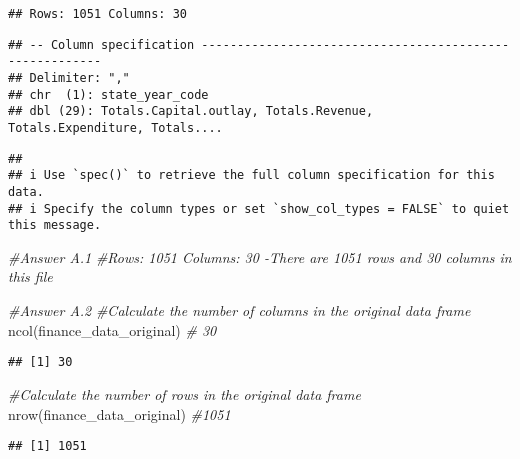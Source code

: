 \documentclass[
]{article}
\newenvironment{Shaded}{\begin{snugshade}}{\end{snugshade}}
\newcommand{\CommentTok}[1]{\textcolor[rgb]{0.56,0.35,0.01}{\textit{#1}}}
\newcommand{\FunctionTok}[1]{\textcolor[rgb]{0.00,0.00,0.00}{#1}}
\newcommand{\NormalTok}[1]{#1}
\begin{document}
\begin{verbatim}
## Rows: 1051 Columns: 30
\end{verbatim}

\begin{verbatim}
## -- Column specification --------------------------------------------------------
## Delimiter: ","
## chr  (1): state_year_code
## dbl (29): Totals.Capital.outlay, Totals.Revenue, Totals.Expenditure, Totals....
\end{verbatim}

\begin{verbatim}
## 
## i Use `spec()` to retrieve the full column specification for this data.
## i Specify the column types or set `show_col_types = FALSE` to quiet this message.
\end{verbatim}

\begin{Shaded}
\begin{Highlighting}[]
\CommentTok{\#Answer A.1}
\CommentTok{\#Rows: 1051 Columns: 30 {-}There are 1051 rows and 30 columns in this file}
\end{Highlighting}
\end{Shaded}

\begin{Shaded}
\begin{Highlighting}[]
\CommentTok{\#Answer A.2}
\CommentTok{\#Calculate the number of columns in the original data frame}
\FunctionTok{ncol}\NormalTok{(finance\_data\_original) }\CommentTok{\# 30}
\end{Highlighting}
\end{Shaded}

\begin{verbatim}
## [1] 30
\end{verbatim}

\begin{Shaded}
\begin{Highlighting}[]
\CommentTok{\#Calculate the number of rows in the original data frame}
\FunctionTok{nrow}\NormalTok{(finance\_data\_original)  }\CommentTok{\#1051}
\end{Highlighting}
\end{Shaded}

\begin{verbatim}
## [1] 1051
\end{verbatim}
\end{document}
